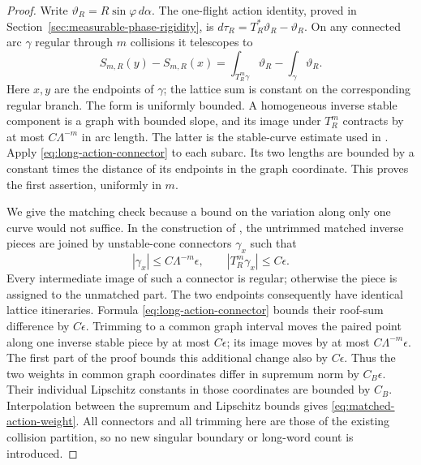 \begin{proof}
Write $\vartheta_R=R\sin\varphi\,d\alpha$. The one-flight action
identity, proved in Section~\ref{sec:measurable-phase-rigidity}, is
$d\tau_R=T_R^*\vartheta_R-\vartheta_R$. On any connected arc
$\gamma$ regular through $m$ collisions it telescopes to
\begin{equation}\label{eq:long-action-connector}
 S_{m,R}(y)-S_{m,R}(x)
       =\int_{T_R^m\gamma}\vartheta_R-\int_\gamma\vartheta_R.
\end{equation}
Here $x,y$ are the endpoints of $\gamma$; the lattice sum is constant
on the corresponding regular branch. The form is uniformly bounded.
A homogeneous inverse stable component is a graph with bounded slope,
and its image under $T_R^m$ contracts by at most $C\Lambda^{-m}$ in
arc length. The latter is the stable-curve estimate used in
\cite[equation (4.6)]{DZ}. Apply
\eqref{eq:long-action-connector} to each subarc. Its two lengths are
bounded by a constant times the distance of its endpoints in the graph
coordinate. This proves the first assertion, uniformly in $m$.

We give the matching check because a bound on the variation along only
one curve would not suffice. In the construction of
\cite[Section 4.3]{DZ}, the untrimmed matched inverse pieces are joined
by unstable-cone connectors $\gamma_x$ such that
\[
 |\gamma_x|\le C\Lambda^{-m}\epsilon,
              \qquad |T_R^m\gamma_x|\le C\epsilon.
\]
Every intermediate image of such a connector is regular; otherwise the
piece is assigned to the unmatched part. The two endpoints consequently
have identical lattice itineraries. Formula
\eqref{eq:long-action-connector} bounds their roof-sum difference by
$C\epsilon$. Trimming to a common graph interval moves the paired
point along one inverse stable piece by at most $C\epsilon$; its image
moves by at most $C\Lambda^{-m}\epsilon$. The first part of the proof
bounds this additional change also by $C\epsilon$. Thus the two weights
in common graph coordinates differ in supremum norm by $C_B\epsilon$.
Their individual Lipschitz constants in those coordinates are bounded
by $C_B$. Interpolation between the supremum and Lipschitz bounds gives
\eqref{eq:matched-action-weight}. All connectors and all trimming here
are those of the existing collision partition, so no new singular
boundary or long-word count is introduced.
\end{proof}

